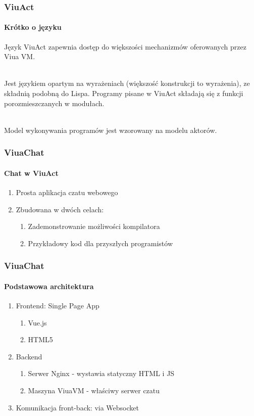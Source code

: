 \documentclass{beamer}
\begin{document}
\begin{frame}
    \frametitle{ViuAct}
    \framesubtitle{Krótko o języku}

    Język ViuAct zapewnia dostęp do większości mechanizmów oferowanych przez Viua VM.

    ~\\

    Jest językiem opartym na wyrażeniach (większość konstrukcji to wyrażenia), ze składnią podobną do Lispa.
    Programy pisane w ViuAct składają się z funkcji porozmieszczanych w modułach.

    ~\\

    Model wykonywania programów jest wzorowany na modelu aktorów.
\end{frame}

\begin{frame}
    \frametitle{ViuaChat}
    \framesubtitle{Chat w ViuAct}

    \begin{enumerate}
        \item Prosta aplikacja czatu webowego
        \item Zbudowana w dwóch celach:
        \begin{enumerate}
        	\item Zademonstrowanie możliwości kompilatora
        	\item Przykładowy kod dla przyszłych programistów
        \end{enumerate}
    \end{enumerate}
\end{frame}

\begin{frame}
    \frametitle{ViuaChat}
    \framesubtitle{Podstawowa architektura}

    \begin{enumerate}
        \item Frontend: Single Page App
        \begin{enumerate}
        	\item Vue.js
        	\item HTML5
        \end{enumerate}
        \item Backend
        \begin{enumerate}
        	\item Serwer Nginx - wystawia statyczny HTML i JS
        	\item Maszyna ViuaVM - właściwy serwer czatu
        \end{enumerate}
        \item Komunikacja front-back: via Websocket
    \end{enumerate}
\end{frame}
\end{document}
